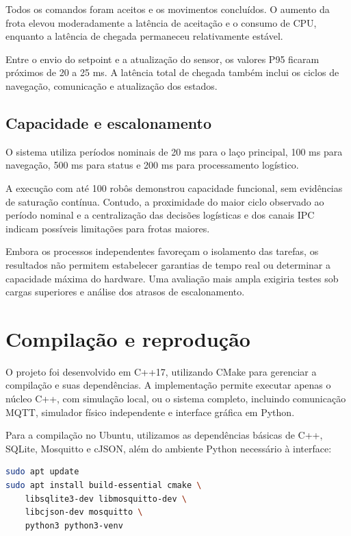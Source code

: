 \documentclass[12pt,a4paper]{article}
\begin{document}
Todos os comandos foram aceitos e os movimentos concluídos. O aumento da frota
elevou moderadamente a latência de aceitação e o consumo de CPU, enquanto a
latência de chegada permaneceu relativamente estável.

Entre o envio do setpoint e a atualização do sensor, os valores P95 ficaram
próximos de 20 a 25 ms. A latência total de chegada também inclui os ciclos de
navegação, comunicação e atualização dos estados.

\subsection{Capacidade e escalonamento}

O sistema utiliza períodos nominais de 20 ms para o laço principal, 100 ms para
navegação, 500 ms para status e 200 ms para processamento logístico.

A execução com até 100 robôs demonstrou capacidade funcional, sem evidências de
saturação contínua. Contudo, a proximidade do maior ciclo observado ao período
nominal e a centralização das decisões logísticas e dos canais IPC indicam
possíveis limitações para frotas maiores.

Embora os processos independentes favoreçam o isolamento das tarefas, os
resultados não permitem estabelecer garantias de tempo real ou determinar a
capacidade máxima do hardware. Uma avaliação mais ampla exigiria testes sob
cargas superiores e análise dos atrasos de escalonamento.

\section{Compilação e reprodução}

O projeto foi desenvolvido em C++17, utilizando CMake para gerenciar a
compilação e suas dependências. A implementação permite executar apenas o
núcleo C++, com simulação local, ou o sistema completo, incluindo comunicação
MQTT, simulador físico independente e interface gráfica em Python.

Para a compilação no Ubuntu, utilizamos as dependências básicas de C++, SQLite,
Mosquitto e cJSON, além do ambiente Python necessário à interface:

\begin{lstlisting}[language=bash]
sudo apt update
sudo apt install build-essential cmake \
    libsqlite3-dev libmosquitto-dev \
    libcjson-dev mosquitto \
    python3 python3-venv
\end{lstlisting}
\end{document}
